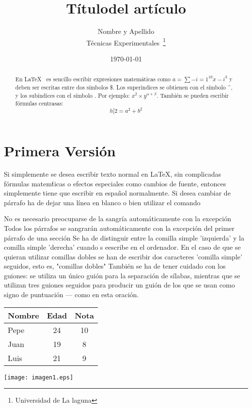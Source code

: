 \documentclass[a4paper,12pt]{article}
\begin{document}
\title{Títulodel artículo}
\author{Nombre y Apellido\\
        Técnicas Experimentales~\footnote{Universidad de La laguna}
        }
\date{\today}
\maketitle
\begin{abstract}
 En \LaTeX{}~\cite{Lam:86} es sencillo escribir expresiones
 matemáticas como $a=\sum-{i=1}^{10} {x-i}^{3}$
 y deben ser escritas entre dos símbolos \$.
 Los superíndices se obtienen con el símbolo \^{}, y 
 los subíndices con el símbolo \-.
 Por ejemplo: $x^2 \times y ^{\alpha + \beta}$.
 También se pueden escribir fórmulas centrasas:
 \[h[ 2=a^2 + b^2\]
 \end{abstract}
  
 \section{Primera Versión} 
 Si simplemente se desea escribir texto normal en LaTeX,
 sin complicadas f\'ormulas matem\'ticas o efectos especiales 
 como cambios de fuente, entonces simplemente tiene que escribir
 en espa\~nol normalmente.
 Si desea cambiar de párrafo ha de dejar una línea en blanco o bien
 utilizar el comando \par
 No es necesario preocuparse de la sangría automáticamente con la excepción
 Todos los párrafos se sangrarán automáticamente con la excepción
 del primer párrafo de una sección
 Se ha de distinguir entre la comilla simple 'izquierda'
 y la comilla simple 'derecha' cuando s eescribe en el ordenador.
 En el caso de que se quieran utilizar comillas dobles se han de 
 escribir dos caracteres 'comilla simple' seguidos, esto es, 
 "comillas dobles"
 También se ha de tener cuidado con los guiones: se utiliza un único
 guión para la separación de sílabas, mientras que se utilizan
 tres guiones seguidos para producir un guión de los que se usan 
 como signo de puntuación --- como en esta oración.
 \bigskip
 \begin{tabular}{|l|c|c|}
 \hline
   Nombre & Edad & Nota \\ \hline
   Pepe   &   24 &   10 \\ \hline
   Juan   &   19 &    8 \\ \hline
   Luis   &   21 &    9 \\ \hline
 \end {tabular} 
 \texttt{[image: imagen1.eps]}
 
\end{document}
